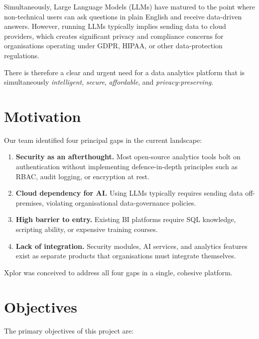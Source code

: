 \documentclass[12pt,a4paper]{report}
\begin{document}
Simultaneously, Large Language Models (LLMs) have matured to the point where non-technical users can ask questions in plain English and receive data-driven answers. However, running LLMs typically implies sending data to cloud providers, which creates significant privacy and compliance concerns for organisations operating under GDPR, HIPAA, or other data-protection regulations.

There is therefore a clear and urgent need for a data analytics platform that is simultaneously \textit{intelligent}, \textit{secure}, \textit{affordable}, and \textit{privacy-preserving}.

\section{Motivation}

Our team identified four principal gaps in the current landscape:

\begin{enumerate}[leftmargin=2em]
    \item \textbf{Security as an afterthought.} Most open-source analytics tools bolt on authentication without implementing defence-in-depth principles such as RBAC, audit logging, or encryption at rest.
    \item \textbf{Cloud dependency for AI.} Using LLMs typically requires sending data off-premises, violating organisational data-governance policies.
    \item \textbf{High barrier to entry.} Existing BI platforms require SQL knowledge, scripting ability, or expensive training courses.
    \item \textbf{Lack of integration.} Security modules, AI services, and analytics features exist as separate products that organisations must integrate themselves.
\end{enumerate}

Xplor was conceived to address all four gaps in a single, cohesive platform.

\section{Objectives}

The primary objectives of this project are:
\end{document}
